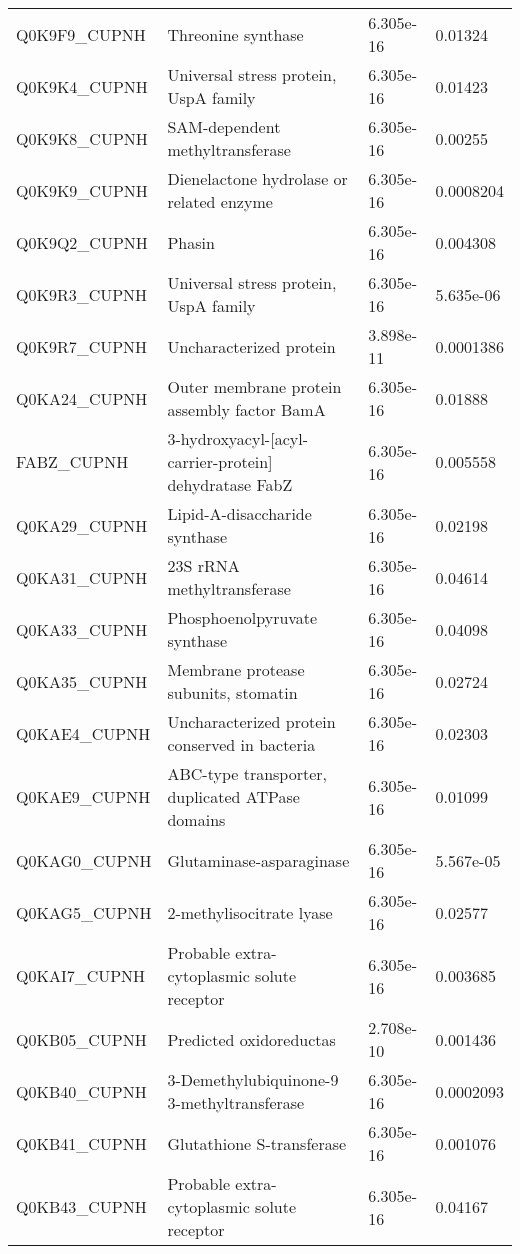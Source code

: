 \begin{center}
\begin{longtable}{ l l l l }
Q0K9F9\_CUPNH & Threonine synthase& 6.305e-16 & 0.01324 \\ [0.5ex]
Q0K9K4\_CUPNH & Universal stress protein, UspA family& 6.305e-16 & 0.01423 \\ [0.5ex]
Q0K9K8\_CUPNH & SAM-dependent methyltransferase& 6.305e-16 & 0.00255 \\ [0.5ex]
Q0K9K9\_CUPNH & Dienelactone hydrolase or related enzyme& 6.305e-16 & 0.0008204 \\ [0.5ex]
Q0K9Q2\_CUPNH & Phasin& 6.305e-16 & 0.004308 \\ [0.5ex]
Q0K9R3\_CUPNH & Universal stress protein, UspA family& 6.305e-16 & 5.635e-06 \\ [0.5ex]
Q0K9R7\_CUPNH & Uncharacterized protein& 3.898e-11 & 0.0001386 \\ [0.5ex]
Q0KA24\_CUPNH & Outer membrane protein assembly factor BamA& 6.305e-16 & 0.01888 \\ [0.5ex]
FABZ\_CUPNH & 3-hydroxyacyl-[acyl-carrier-protein] dehydratase FabZ& 6.305e-16 & 0.005558 \\ [0.5ex]
Q0KA29\_CUPNH & Lipid-A-disaccharide synthase& 6.305e-16 & 0.02198 \\ [0.5ex]
Q0KA31\_CUPNH & 23S rRNA methyltransferase& 6.305e-16 & 0.04614 \\ [0.5ex]
Q0KA33\_CUPNH & Phosphoenolpyruvate synthase& 6.305e-16 & 0.04098 \\ [0.5ex]
Q0KA35\_CUPNH & Membrane protease subunits, stomatin & 6.305e-16 & 0.02724 \\ [0.5ex]
Q0KAE4\_CUPNH & Uncharacterized protein conserved in bacteria& 6.305e-16 & 0.02303 \\ [0.5ex]
Q0KAE9\_CUPNH & ABC-type transporter, duplicated ATPase domains & 6.305e-16 & 0.01099 \\ [0.5ex]
Q0KAG0\_CUPNH & Glutaminase-asparaginase& 6.305e-16 & 5.567e-05 \\ [0.5ex]
Q0KAG5\_CUPNH & 2-methylisocitrate lyase& 6.305e-16 & 0.02577 \\ [0.5ex]
Q0KAI7\_CUPNH & Probable extra-cytoplasmic solute receptor& 6.305e-16 & 0.003685 \\ [0.5ex]
Q0KB05\_CUPNH & Predicted oxidoreductas& 2.708e-10 & 0.001436 \\ [0.5ex]
Q0KB40\_CUPNH & 3-Demethylubiquinone-9 3-methyltransferase& 6.305e-16 & 0.0002093 \\ [0.5ex]
Q0KB41\_CUPNH & Glutathione S-transferase& 6.305e-16 & 0.001076 \\ [0.5ex]
Q0KB43\_CUPNH & Probable extra-cytoplasmic solute receptor& 6.305e-16 & 0.04167 \\ [0.5ex]

\end{longtable}
\end{center}
